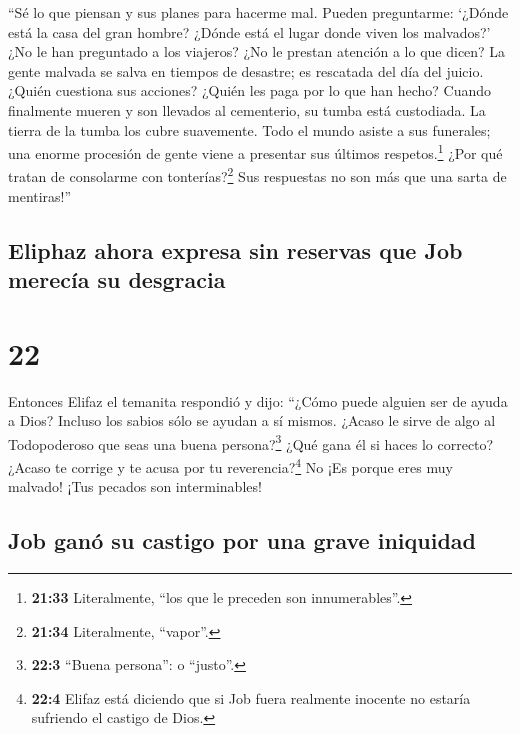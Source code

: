  ``Sé lo que piensan y sus planes para hacerme mal.
 Pueden preguntarme: `¿Dónde está la casa del gran
hombre? ¿Dónde está el lugar donde viven los malvados?' 
¿No le han preguntado a los viajeros? ¿No le prestan atención a lo que
dicen?  La gente malvada se salva en tiempos de desastre;
es rescatada del día del juicio.  ¿Quién cuestiona sus
acciones? ¿Quién les paga por lo que han hecho?  Cuando
finalmente mueren y son llevados al cementerio, su tumba está
custodiada. La tierra de la tumba los cubre suavemente. 
Todo el mundo asiste a sus funerales; una enorme procesión de gente
viene a presentar sus últimos respetos.\footnote{\textbf{21:33}
  Literalmente, ``los que le preceden son innumerables''.}
 ¿Por qué tratan de consolarme con tonterías?\footnote{\textbf{21:34}
  Literalmente, ``vapor''.} Sus respuestas no son más que una sarta de
mentiras!''

\hypertarget{eliphaz-ahora-expresa-sin-reservas-que-job-merecuxeda-su-desgracia}{%
\subsection{Eliphaz ahora expresa sin reservas que Job merecía su
desgracia}\label{eliphaz-ahora-expresa-sin-reservas-que-job-merecuxeda-su-desgracia}}

\hypertarget{section-21}{%
\section{22}\label{section-21}}

 Entonces Elifaz el temanita respondió y dijo:
 ``¿Cómo puede alguien ser de ayuda a Dios? Incluso los
sabios sólo se ayudan a sí mismos.  ¿Acaso le sirve de
algo al Todopoderoso que seas una buena persona?\footnote{\textbf{22:3}
  ``Buena persona'': o ``justo''.} ¿Qué gana él si haces lo correcto?
 ¿Acaso te corrige y te acusa por tu
reverencia?\footnote{\textbf{22:4} Elifaz está diciendo que si Job fuera
  realmente inocente no estaría sufriendo el castigo de Dios.}
 No ¡Es porque eres muy malvado! ¡Tus pecados son
interminables!

\hypertarget{job-ganuxf3-su-castigo-por-una-grave-iniquidad}{%
\subsection{Job ganó su castigo por una grave
iniquidad}\label{job-ganuxf3-su-castigo-por-una-grave-iniquidad}}


